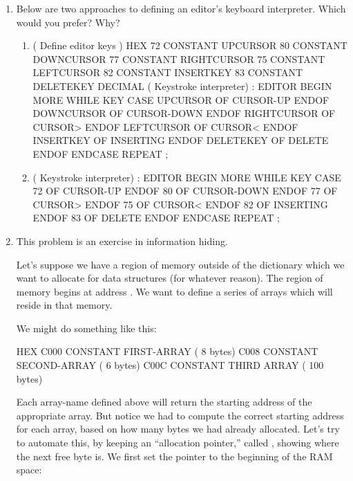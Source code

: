 \begin{enumerate}
\item Below are two approaches to defining an editor's keyboard
interpreter.  Which would you prefer? Why?

\begin{enumerate}
\item \begin{Code}
( Define editor keys )
HEX
72 CONSTANT UPCURSOR
80 CONSTANT DOWNCURSOR
77 CONSTANT RIGHTCURSOR
75 CONSTANT LEFTCURSOR
82 CONSTANT INSERTKEY
83 CONSTANT DELETEKEY
DECIMAL
( Keystroke interpreter)
: EDITOR
   BEGIN  MORE WHILE  KEY   CASE
      UPCURSOR     OF  CURSOR-UP     ENDOF
      DOWNCURSOR   OF  CURSOR-DOWN   ENDOF
      RIGHTCURSOR  OF  CURSOR>       ENDOF
      LEFTCURSOR   OF  CURSOR<       ENDOF
      INSERTKEY    OF  INSERTING     ENDOF
      DELETEKEY    OF  DELETE        ENDOF
   ENDCASE  REPEAT ;
\end{Code}
\medbreak\item \begin{Code}
( Keystroke interpreter)
: EDITOR
   BEGIN  MORE WHILE  KEY   CASE
      72 OF  CURSOR-UP     ENDOF
      80 OF  CURSOR-DOWN   ENDOF
      77 OF  CURSOR>       ENDOF
      75 OF  CURSOR<       ENDOF
      82 OF  INSERTING     ENDOF
      83 OF  DELETE        ENDOF
   ENDCASE  REPEAT ;
\end{Code}
\end{enumerate}

\item This problem is an exercise in information hiding.

Let's suppose we have a region of memory outside of the \Forth{}
dictionary which we want to allocate for data structures (for whatever
reason). The region of memory begins at  address . We want to
define a series of arrays which will reside in that memory.

 We might do something like this:

\begin{Code}
HEX
C000 CONSTANT FIRST-ARRAY  ( 8 bytes)
C008 CONSTANT SECOND-ARRAY  ( 6 bytes)
C00C CONSTANT THIRD ARRAY  ( 100 bytes)
\end{Code}
Each array-name defined above will return the starting address of the
appropriate array. But notice we had to compute the correct starting
address for each array, based on how many bytes we had already
allocated. Let's try to automate this, by keeping an ``allocation
pointer,'' called , showing where the next free byte is. We first
set the pointer to the beginning of the RAM space:


\end{enumerate}

